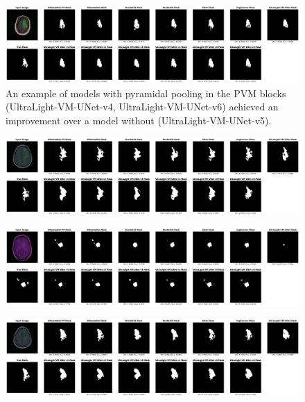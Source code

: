 \documentclass[conference]{IEEEtran}
\begin{document}
\begin{figure}[!h]
    \centering
    \includegraphics[width=\textwidth]{imgs/0_0.png}
    \caption{An example of models with pyramidal pooling in the PVM blocks (UltraLight-VM-UNet-v4, UltraLight-VM-UNet-v6) achieved an improvement over a model without (UltraLight-VM-UNet-v5).}
\end{figure}

\begin{figure}[!h]
    \centering
    \includegraphics[width=\textwidth]{imgs/12_2.png}
\end{figure}
\begin{figure}[!h]
    \centering
    \includegraphics[width=\textwidth]{imgs/22_3.png}
\end{figure}
\begin{figure}[!h]
    \centering
    \includegraphics[width=\textwidth]{imgs/22_7.png}
\end{figure}
\end{document}

